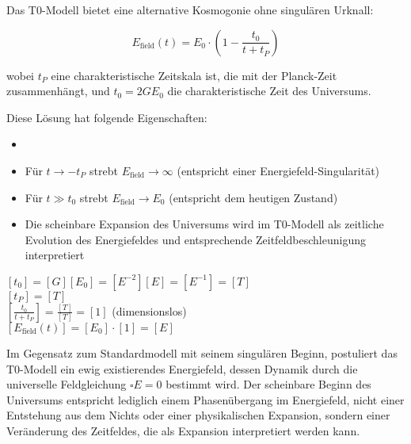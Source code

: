 \documentclass[12pt,a4paper]{article}
\theoremstyle{definition}
\begin{document}
Das T0-Modell bietet eine alternative Kosmogonie ohne singulären Urknall:

\begin{equation}
	E_{\text{field}}(t) = E_0 \cdot \left(1 - \frac{t_0}{t + t_P}\right)
\end{equation}

wobei $t_P$ eine charakteristische Zeitskala ist, die mit der Planck-Zeit zusammenhängt, und $t_0 = 2GE_0$ die charakteristische Zeit des Universums.

Diese Lösung hat folgende Eigenschaften:
\begin{itemize}
	\item     \item Für $t \to -t_P$ strebt $E_{\text{field}} \to \infty$ (entspricht einer Energiefeld-Singularität)
	\item Für $t \gg t_0$ strebt $E_{\text{field}} \to E_0$ (entspricht dem heutigen Zustand)
	\item Die scheinbare Expansion des Universums wird im T0-Modell als zeitliche Evolution des Energiefeldes und entsprechende Zeitfeldbeschleunigung interpretiert
\end{itemize}

\begin{einheitencheck}
	$[t_0] = [G][E_0] = [E^{-2}][E] = [E^{-1}] = [T]$ \checkmark\\
	$[t_P] = [T]$ \checkmark\\
	$[\frac{t_0}{t + t_P}] = \frac{[T]}{[T]} = [1]$ (dimensionslos) \checkmark\\
	$[E_{\text{field}}(t)] = [E_0] \cdot [1] = [E]$ \checkmark
\end{einheitencheck}

\begin{wichtig}
	Im Gegensatz zum Standardmodell mit seinem singulären Beginn, postuliert das T0-Modell ein ewig existierendes Energiefeld, dessen Dynamik durch die universelle Feldgleichung $\square E = 0$ bestimmt wird. Der scheinbare Beginn des Universums entspricht lediglich einem Phasenübergang im Energiefeld, nicht einer Entstehung aus dem Nichts oder einer physikalischen Expansion, sondern einer Veränderung des Zeitfeldes, die als Expansion interpretiert werden kann.
\end{wichtig}
\end{document}
